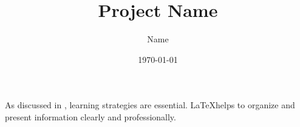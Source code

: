 \documentclass[12pt]{article}
\begin{document}
\title{Project Name}
\author{Name}
\date{\today}

\maketitle

\tableofcontents
\newpage




As discussed in \cite{knuth1984texbook}, learning strategies are essential. \LaTeX helps to organize and present information clearly and professionally.



\end{document}
